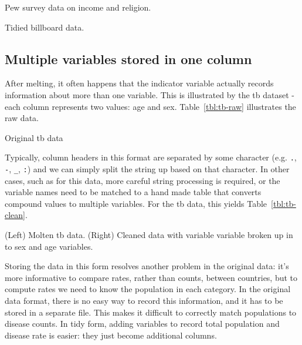 \documentclass[oneside]{article}
\begin{document}
\begin{table}[htbp]
  \centering
  
  \caption{Pew survey data on income and religion.}
  \label{tbl:pew-clean}
\end{table}

\begin{table}[htbp]
  \centering
  
  \caption{Tidied billboard data.}
  \label{tbl:billboard-clean}
\end{table}


\subsection{Multiple variables stored in one column}

After melting, it often happens that the indicator variable actually records information about more than one variable. This is illustrated by the tb dataset - each column represents two values: age and sex.  Table~\ref{tbl:tb-raw} illustrates the raw data. 

\begin{table}[htbp]
  \centering
  
  \caption{Original tb data}
  \label{tbl:tb-raw}
\end{table}

Typically, column headers in this format are separated by some character (e.g. {\tt .}, {\tt -}, {\tt \_}, {\tt :}) and we can simply split the string up based on that character. In other cases, such as for this data, more careful string processing is required, or the variable names need to be matched to a hand made table that converts compound values to multiple variables. For the tb data, this yields Table~\ref{tbl:tb-clean}.

\begin{table}[htbp]
  \centering
  
  
  \caption{(Left) Molten tb data. (Right) Cleaned data with variable variable broken up in to sex and age variables.}
  \label{tbl:tb-clean}
\end{table}

Storing the data in this form resolves another problem in the original data: it's more informative to compare rates, rather than counts, between countries, but to compute rates we need to know the population in each category. In the original data format, there is no easy way to record this information, and it has to be stored in a separate file. This makes it difficult to correctly match populations to disease counts. In tidy form, adding variables to record total population and disease rate is easier: they just become additional columns.
\end{document}
